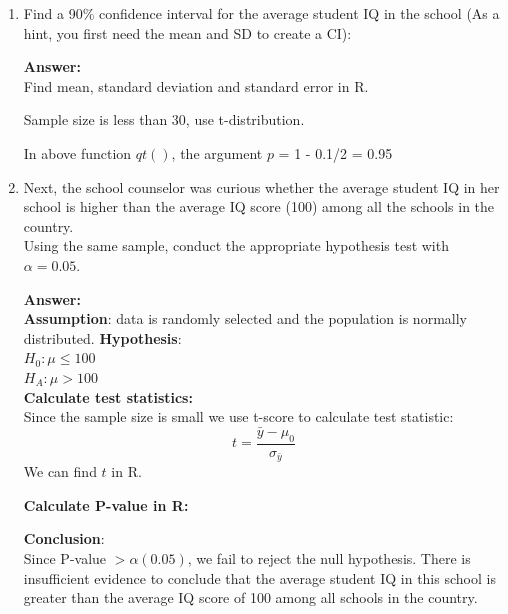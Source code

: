 \documentclass[12pt,letterpaper]{article}
\begin{document}
\begin{enumerate}
	\item Find a 90\% confidence interval for the average student IQ in the school (As a hint, you first need the mean and SD to create a CI):\\
	
	
	\begin{doublespace}
	\textbf{Answer:}\\
	Find mean, standard deviation and standard error in R.
	
	
	Sample size is less than 30, use t-distribution.
	
	In above function $qt()$, the argument $p$ = 1 - 0.1/2 = 0.95
	
	
	\end{doublespace}

	\item Next, the school counselor was curious  whether  the average student IQ in her school is higher than the average IQ score (100) among all the schools in the country.\\ 
	
	\noindent Using the same sample, conduct the appropriate hypothesis test with $\alpha=0.05$.
	
	\begin{doublespace}
		\textbf{Answer:}\\
		\textbf{Assumption}: data is randomly selected and the population is normally distributed.
		\textbf{Hypothesis}:\\
		$H_0: \mu \leq 100$\\
		$H_A: \mu > 100$\\
		
		\textbf{Calculate test statistics:} \\
		Since the sample size is small we use t-score to calculate test statistic:
		$$t = \frac{\bar{y} - \mu_0}{\sigma_{\bar{y}}}$$
		We can find $t$ in R.
		
		
		\textbf{Calculate P-value in R:}
		
		
		\textbf{Conclusion}:\\
		Since P-value $>\alpha(0.05)$, we fail to reject the null hypothesis. There is insufficient evidence to conclude that the average student IQ in this school is greater than the average IQ score of 100 among all schools in the country.
	\end{doublespace}
\end{enumerate}
\end{document}
